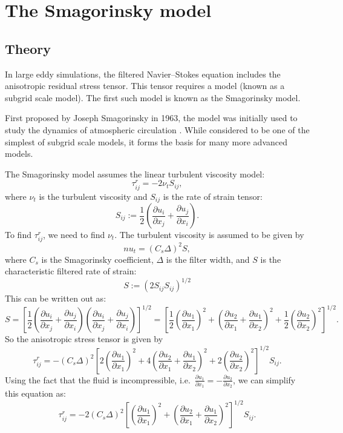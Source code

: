 \documentclass[11pt,a4paper]{article}
\begin{document}
\section{The Smagorinsky model}
\subsection{Theory}
In large eddy simulations, the filtered Navier--Stokes equation includes the anisotropic residual stress tensor. This tensor requires a model (known as a subgrid scale model). The first such model is known as the Smagorinsky model.

First proposed by Joseph Smagorinsky in 1963, the model was initially used to study the dynamics of atmospheric circulation \cite{Smagorinsky1963}. While considered to be one of the simplest of subgrid scale models, it forms the basis for many more advanced  models. 

The Smagorinsky model assumes the linear turbulent viscosity model:
$$\tau_{ij}^r = -2\nu_t {S}_{ij},$$
where $\nu_t$ is the turbulent viscosity and $S_{ij}$ is the rate of strain tensor:
$${S}_{ij} := \frac{1}{2}\left( \frac{\partial {u}_i}{\partial x_j} + \frac{\partial {u}_j}{\partial x_i}\right).$$
To find $\tau_{ij}^r$, we need to find $\nu_t$. The turbulent viscosity is assumed to be given by
\begin{equation}\label{smag_nut}
nu_t = (C_s \Delta)^2 {S},
\end{equation}
where $C_s$ is the Smagorinsky coefficient, $\Delta$ is the filter width, and ${S}$ is the characteristic filtered rate of strain:
$${S} := \left(2{S}_{ij}{S}_{ij}\right)^{1/2}$$
This can be written out as:
$${S} = \left[\frac{1}{2}\left( \frac{\partial {u}_i}{\partial x_j} + \frac{\partial {u}_j}{\partial x_i}\right)\left( \frac{\partial {u}_i}{\partial x_j} + \frac{\partial {u}_j}{\partial x_i}\right)\right]^{1/2} = \left[\frac{1}{2}\left( \frac{\partial {u}_1}{\partial x_1}\right)^2+\left( \frac{\partial {u}_2}{\partial x_1} + \frac{\partial {u}_1}{\partial x_2}\right)^2+\frac{1}{2}\left( \frac{\partial {u}_2}{\partial x_2}\right)^2 \right]^{1/2}.$$
So the anisotropic stress tensor is given by
\begin{equation}
\tau_{ij}^r = -(C_s \Delta)^2\left[2\left( \frac{\partial {u}_1}{\partial x_1}\right)^2+4\left( \frac{\partial {u}_2}{\partial x_1} + \frac{\partial {u}_1}{\partial x_2}\right)^2+2\left( \frac{\partial {u}_2}{\partial x_2}\right)^2 \right]^{1/2}{S}_{ij}.
\end{equation}
Using the fact that the fluid is incompressible, i.e.\ $\frac{\partial {u}_1}{\partial x_1} = -\frac{\partial {u}_2}{\partial x_2}$, we can simplify this equation as:
\begin{equation}\label{smagTau}
\tau_{ij}^r = -2(C_s \Delta)^2\left[\left( \frac{\partial {u}_1}{\partial x_1}\right)^2+\left( \frac{\partial {u}_2}{\partial x_1} + \frac{\partial {u}_1}{\partial x_2}\right)^2 \right]^{1/2}{S}_{ij}.
\end{equation}
\end{document}
